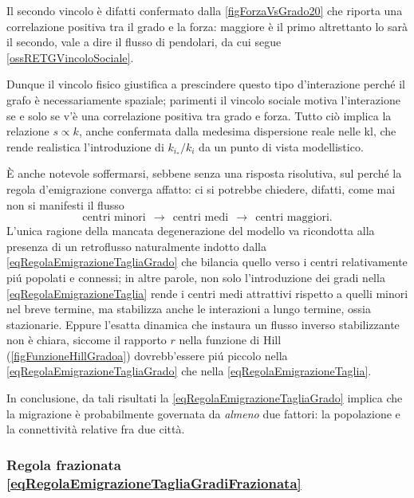         Il secondo vincolo è difatti confermato dalla \cref{figForzaVsGrado20} che riporta una correlazione positiva tra il grado e la forza: maggiore è il primo altrettanto lo sarà il secondo, vale a dire il flusso di pendolari, da cui segue \ref{ossRETGVincoloSociale}.
        
        Dunque il vincolo fisico giustifica a prescindere questo tipo d'interazione perché il grafo è necessariamente spaziale; parimenti il vincolo sociale motiva l'interazione se e solo se v'è una correlazione positiva tra grado e forza\footnotemark{}. Tutto ciò implica la relazione %
        \(s\propto k\), anche confermata dalla medesima dispersione reale nelle kl, che rende realistica l'introduzione di \(k_{i_*}/k_i\) da un punto di vista modellistico.%

        È anche notevole soffermarsi, sebbene senza una risposta risolutiva, sul perché la regola d'emigrazione converga affatto: ci si potrebbe chiedere, difatti, come mai non si manifesti il flusso
        \[
          \text{centri minori}\ \ \to\ \ \text{centri medi}\ \ \to\ \ \text{centri maggiori}.
        \]
        L'unica ragione della mancata degenerazione del modello va ricondotta alla presenza di un retroflusso naturalmente indotto dalla \ref{eqRegolaEmigrazioneTagliaGrado} che bilancia quello verso i centri relativamente piú popolati e connessi; in altre parole, non solo l'introduzione dei gradi nella \ref{eqRegolaEmigrazioneTaglia} rende i centri medi attrattivi rispetto a quelli minori nel breve termine, ma stabilizza anche le interazioni a lungo termine, ossia stazionarie. Eppure l'esatta dinamica che instaura un flusso inverso stabilizzante non è chiara, siccome il rapporto \(r\) nella funzione di Hill (\cref{figFunzioneHillGradoa}) dovrebb'essere piú piccolo nella \ref{eqRegolaEmigrazioneTagliaGrado} che nella \ref{eqRegolaEmigrazioneTaglia}.
        
        In conclusione, da tali risultati la \ref{eqRegolaEmigrazioneTagliaGrado} implica che la migrazione è probabilmente governata da \textit{almeno} due fattori: la popolazione e la connettività relative fra due città.

      \subsubsection{Regola frazionata \ref{eqRegolaEmigrazioneTagliaGradiFrazionata}}

